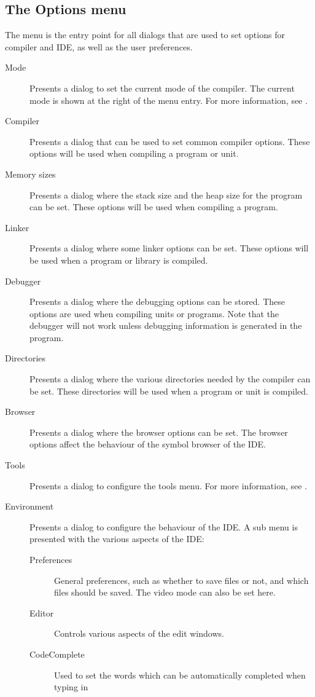 \subsection{The Options menu}
\label{se:menuoptions}
The  menu is the entry point for all dialogs that are used to set
options for compiler and IDE, as well as the user preferences.
\begin{description}
\item[Mode] Presents a dialog to set the current mode of the compiler. The
current mode is shown at the right of the menu entry. For more information,
see .
\item[Compiler] Presents a dialog that can be used to set common compiler
options. These options will be used when compiling a program or unit.
\item[Memory sizes]
Presents a dialog where the stack size and the heap size for the program can
be set. These options will be used when compiling a program.
\item[Linker]
Presents a dialog where some linker options can be set. These options will
be used when a program or library is compiled.
\item[Debugger]
Presents a dialog where the debugging options can be stored. These options
are used when compiling units or programs. Note that the debugger will not
work unless debugging information is generated in the program.
\item[Directories]
Presents a dialog where the various directories needed by the compiler can
be set. These directories will be used when a program or unit is compiled.
\item[Browser]
Presents a dialog where the browser options can be set. The browser options
affect the behaviour of the symbol browser of the IDE. 
\item[Tools]
Presents a dialog to configure the tools menu. For more information, see
.
\item[Environment]
Presents a dialog to configure the behaviour of the IDE. A sub menu is
presented with the various aspects of the IDE:
\begin{description}
\item[Preferences]
General preferences, such as whether to save files or not, and which files
should be saved. The video mode can also be set here.
\item[Editor]
Controls various aspects of the edit windows.
\item[CodeComplete]
Used to set the words which can be automatically completed when typing in

\end{description}
\end{description}
